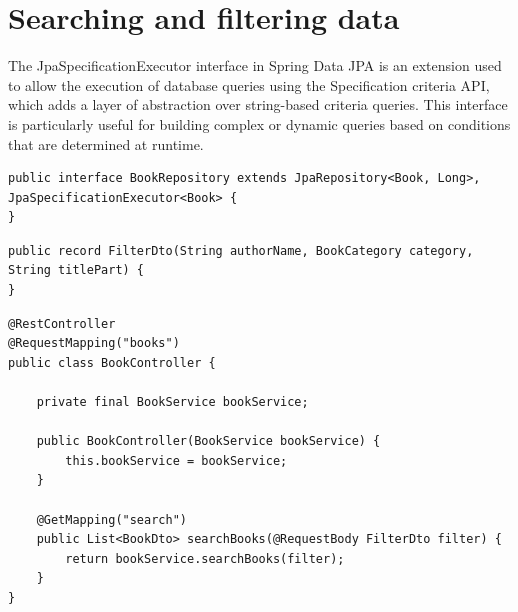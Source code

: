 \section{Searching and filtering data}

The JpaSpecificationExecutor interface in Spring Data JPA is an extension used to allow the execution of database queries using the Specification criteria API, which adds a layer of abstraction over string-based criteria queries. This interface is particularly useful for building complex or dynamic queries based on conditions that are determined at runtime.

\begin{lstlisting}
public interface BookRepository extends JpaRepository<Book, Long>, JpaSpecificationExecutor<Book> {
}
\end{lstlisting}

\begin{lstlisting}
public record FilterDto(String authorName, BookCategory category, String titlePart) {
}
\end{lstlisting}

\begin{lstlisting}
@RestController
@RequestMapping("books")
public class BookController {

    private final BookService bookService;

    public BookController(BookService bookService) {
        this.bookService = bookService;
    }

    @GetMapping("search")
    public List<BookDto> searchBooks(@RequestBody FilterDto filter) {
        return bookService.searchBooks(filter);
    }
}

\end{lstlisting}


